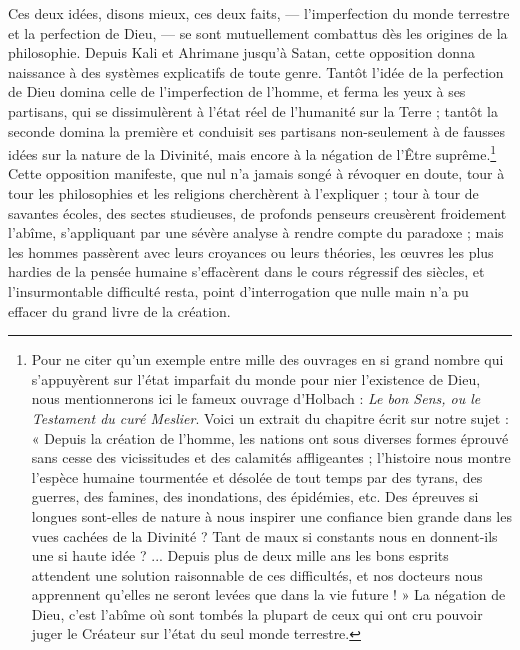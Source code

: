 \documentclass[a4paper, 11pt, oneside, landscape]{article}
\begin{document}
Ces deux idées, disons mieux, ces deux faits, --- l'imperfection du monde terrestre et la perfection de Dieu, --- se sont mutuellement combattus dès les origines de la philosophie. Depuis Kali et Ahrimane jusqu'à Satan, cette opposition donna naissance à des systèmes explicatifs de toute genre. Tantôt l'idée de la perfection de Dieu domina celle de l'imperfection de l'homme, et ferma les yeux à ses partisans, qui se dissimulèrent à l'état réel de l'humanité sur la Terre ; tantôt la seconde domina la première et conduisit ses partisans non-seulement à de fausses idées sur la nature de la Divinité, mais encore à la négation de l'Être suprême.\footnote{Pour ne citer qu'un exemple entre mille des ouvrages en si grand nombre qui s'appuyèrent sur l'état imparfait du monde pour nier l'existence de Dieu, nous mentionnerons ici le fameux ouvrage d'Holbach : \emph{Le bon Sens, ou le Testament du curé Meslier}. Voici un extrait du chapitre écrit sur notre sujet : « Depuis la création de l'homme, les nations ont sous diverses formes éprouvé sans cesse des vicissitudes et des calamités affligeantes ; l'histoire nous montre l'espèce humaine tourmentée et désolée de tout temps par des tyrans, des guerres, des famines, des inondations, des épidémies, etc. Des épreuves si longues sont-elles de nature à nous inspirer une confiance bien grande dans les vues cachées de la Divinité ? Tant de maux si constants nous en donnent-ils une si haute idée ? ... Depuis plus de deux mille ans les bons esprits attendent une solution raisonnable de ces difficultés, et nos docteurs nous apprennent qu'elles ne seront levées que dans la vie future ! » La négation de Dieu, c'est l'abîme où sont tombés la plupart de ceux qui ont cru pouvoir juger le Créateur sur l'état du seul monde terrestre.} Cette opposition manifeste, que nul n'a jamais songé à révoquer en doute, tour à tour les philosophies et les religions cherchèrent à l'expliquer ; tour à tour de savantes écoles, des sectes studieuses, de profonds penseurs creusèrent froidement l'abîme, s'appliquant par une sévère analyse à rendre compte du paradoxe ; mais les hommes passèrent avec leurs croyances ou leurs théories, les œuvres les plus hardies de la pensée humaine s'effacèrent dans le cours régressif des siècles, et l'insurmontable difficulté resta, point d'interrogation que nulle main n'a pu effacer du grand livre de la création.
\end{document}
